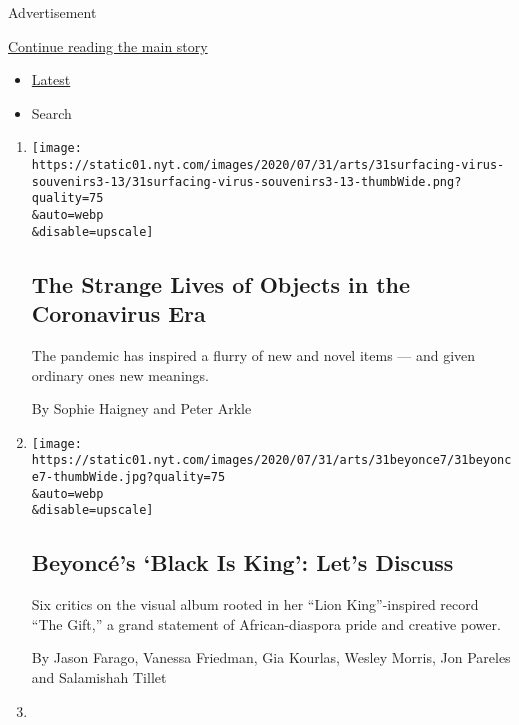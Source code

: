 Advertisement

\protect\hyperlink{after-mid1}{Continue reading the main story}

\begin{itemize}
\tightlist
\item
  \protect\hyperlink{stream-panel}{Latest}
\item
  Search
\end{itemize}

\begin{enumerate}
\def\labelenumi{\arabic{enumi}.}
\item
  \href{/2020/08/01/arts/design/virus-design-objects.html}{}

  \texttt{[image: https://static01.nyt.com/images/2020/07/31/arts/31surfacing-virus-souvenirs3-13/31surfacing-virus-souvenirs3-13-thumbWide.png?quality=75\\\&auto=webp\\\&disable=upscale]}

  \hypertarget{the-strange-lives-of-objects-in-the-coronavirus-era}{%
  \subsection{The Strange Lives of Objects in the Coronavirus
  Era}\label{the-strange-lives-of-objects-in-the-coronavirus-era}}

  The pandemic has inspired a flurry of new and novel items --- and
  given ordinary ones new meanings.

  By Sophie Haigney and Peter Arkle
\item
  \href{/2020/07/31/arts/music/beyonce-black-is-king.html}{}

  \texttt{[image: https://static01.nyt.com/images/2020/07/31/arts/31beyonce7/31beyonce7-thumbWide.jpg?quality=75\\\&auto=webp\\\&disable=upscale]}

  \hypertarget{beyoncuxe9s-black-is-king-lets-discuss}{%
  \subsection{Beyoncé's `Black Is King': Let's
  Discuss}\label{beyoncuxe9s-black-is-king-lets-discuss}}

  Six critics on the visual album rooted in her ``Lion King''-inspired
  record ``The Gift,'' a grand statement of African-diaspora pride and
  creative power.

  By Jason Farago, Vanessa Friedman, Gia Kourlas, Wesley Morris, Jon
  Pareles and Salamishah Tillet
\item
  \href{/2020/07/31/arts/design/heather-phillipson-fourth-plinth.html}{}


\end{enumerate}
